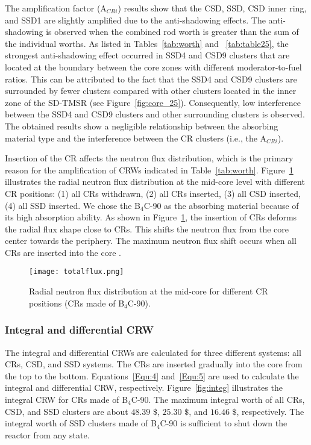 The amplification factor (A$_{CRi}$) results show that the CSD, SSD, CSD inner 
ring, and SSD1 are slightly amplified due to the anti-shadowing effects. The 
anti-shadowing is observed when the combined rod worth is greater than the sum 
of the individual worths. As listed in Tables~\ref{tab:worth} and ~\ref{tab:table25}, the strongest anti-shadowing effect occurred in 
SSD4 and CSD9 clusters that are located at the boundary between the core zones 
with different moderator-to-fuel ratios. This can be attributed to the fact that the SSD4 and CSD9 clusters are surrounded by fewer clusters compared with other clusters located in the inner zone of the SD-TMSR (see Figure~\ref{fig:core_25}). Consequently, low interference between the SSD4 and CSD9 clusters and other surrounding clusters is observed. The obtained results show a negligible relationship between the absorbing material type and the interference between the CR clusters (i.e., the A$_{CRi}$).

Insertion of the CR affects the neutron flux distribution, which is 
the primary reason for the amplification of CRWs indicated in 
Table~\ref{tab:worth}. Figure~\ref{fig:totalflux} illustrates the radial 
neutron flux distribution at the mid-core level with different CR positions: 
(1) all CRs withdrawn, (2) all CRs inserted, (3) all CSD inserted, (4) all SSD 
inserted. We chose the B$_4$C-90 as the absorbing material because of its high 
absorption ability. As shown in Figure~\ref{fig:totalflux}, the insertion of 
CRs deforms the radial flux shape close to CRs.
This shifts the neutron flux from the core center towards the 
periphery. The maximum neutron flux shift occurs when all CRs are inserted 
into the core \cite{girardin2007control}.
\begin{figure}[!ht]
	\centering
	\texttt{[image: totalflux.png]}
	\vspace{-0.5in}
	\caption{Radial neutron flux distribution at the mid-core for different 
	CR positions (CRs made of B$_4$C-90).} 
	\label{fig:totalflux}
\end{figure}
 

\subsubsection{Integral and differential CRW}

The integral and differential CRWs are calculated for three 
different systems: all CRs, CSD, and SSD systems. The CRs are 
inserted gradually into the core from the top to the bottom. 
Equations~\ref{Equ:4} and~\ref{Equ:5} are used to calculate the integral and 
differential CRW, respectively. Figure~\ref{fig:integ} illustrates the integral CRW for CRs 
made of B$_4$C-90. The maximum integral worth of all CRs, CSD, and SSD 
clusters are about $48.39$ $\$$, $25.30$ $\$$, and $16.46$ $\$$, respectively. The 
integral worth of SSD clusters made of B$_4$C-90 is sufficient to shut down the reactor from any 
state.

